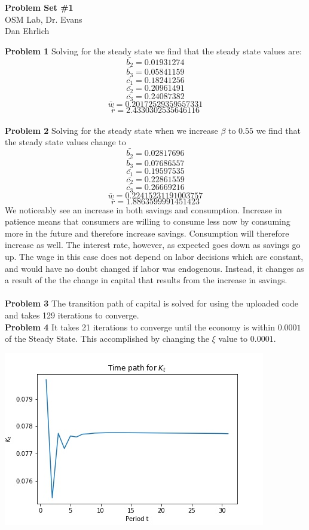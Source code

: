 \documentclass[letterpaper,12pt]{article}
\theoremstyle{definition}
\begin{document}
\begin{flushleft}
  \textbf{\large{Problem Set \#1}} \\
  OSM Lab, Dr. Evans \\
  Dan Ehrlich
\end{flushleft}

\vspace{5mm}

\noindent\textbf{Problem 1}
Solving for the steady state we find that the steady state values are:
$$\bar{b_2} = 0.01931274$$ 
$$\bar{b_3} = 0.05841159$$ 
$$\bar{c_1} =0.18241256	$$
$$\bar{c_2} =0.20961491	$$
$$\bar{c_3} =	0.24087382$$
$$\bar{w} = 0.20172529359557331	$$
$$\bar{r} = 2.4330302535646116	$$\\

\noindent\textbf{Problem 2}
Solving for the steady state when we increase $\beta$ to $0.55$ we find that the steady state values change to
$$\bar{b_2} = 0.02817696 $$ 
$$\bar{b_3} =  0.07686557$$ 
$$\bar{c_1} =0.19597535	$$
$$\bar{c_2} =0.22861559$$
$$\bar{c_3} =	0.26669216$$
$$\bar{w} =  0.22415231191003757	$$
$$\bar{r} = 1.8863599991451423 $$
We noticeably see an increase in both savings and consumption. Increase in patience means that consumers are willing to consume less now by consuming more in the future and therefore increase savings. Consumption will therefore increase as well. The interest rate, however, as expected goes down as savings go up. The wage in this case does not depend on labor decisions which are constant, and would have no doubt changed if labor was endogenous. Instead, it changes as a result of the the change in capital that results from the increase in savings.\\\\  

\noindent\textbf{Problem 3} The transition path of capital is solved for using the uploaded code and takes 129 iterations to converge. \\

\noindent\textbf{Problem 4} It takes 21 iterations to converge until the economy is within $0.0001$ of the Steady State. This accomplished by changing the $\xi$ value to $0.0001$. 

\includegraphics{TPIgraph.jpeg}
\end{document}
